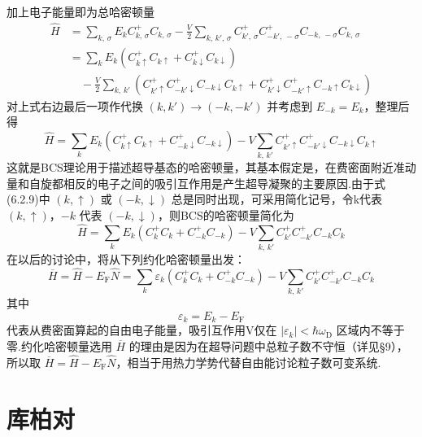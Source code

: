 加上电子能量即为总哈密顿量
\begin{equation*}
\begin{aligned}
  \hat{H}&=\sum_{k,\,\sigma}E_{k}C^{+}_{k,\,\sigma}C_{k,\,\sigma}
  -\frac{V}{2}\sum_{k,\,k',\,\sigma}
  C^{+}_{k',\,\sigma}C^{+}_{-k',\,-\sigma}C_{-k,\,-\sigma}C_{k,\,\sigma}\\
  &=\sum_{k}E_{k}\left(C^{+}_{k\uparrow}C_{k\uparrow}
  +C^{+}_{k\downarrow}C_{k\downarrow}\right)\\
  &\quad-\frac{V}{2}\sum_{k,\,k'}\left(C^{+}_{k'\uparrow}C^{+}_{-k'\downarrow}
  C_{-k\downarrow}C_{k\uparrow}
  +C^{+}_{k'\downarrow}C^{+}_{-k'\uparrow}C_{-k\uparrow}C_{k\downarrow}\right)
\end{aligned}
\end{equation*}
对上式右边最后一项作代换 $(k,k')\to(-k,-k')$ 并考虑到 $E_{-k}=E_{k}$，整理后得
\begin{equation}
  \hat{H}=\sum_{k}E_{k}\left(C^{+}_{k\uparrow}C_{k\uparrow}
  +C^{+}_{-k\downarrow}C_{-k\downarrow}\right)
  -V\sum_{k,\,k'}C^{+}_{k'\uparrow}C^{+}_{-k'\downarrow}C_{-k\downarrow}C_{k\uparrow}
\end{equation}
这就是BCS理论用于描述超导基态的哈密顿量，其基本假定是，在费密面附近准动量和自旋都相反的电子之间的吸引互作用是产生超导凝聚的主要原因.由于式(6.2.9)中 $(k,\uparrow)$ 或 $(-k,\downarrow)$ 总是同时出现，可采用简化记号，令k代表 $(k,\uparrow)$，$-k$ 代表 $(-k,\downarrow)$，则BCS的哈密顿量简化为
\begin{equation}
  \hat{H}=\sum_{k}E_{k}\left(C^{+}_{k}C_{k}+C^{+}_{-k}C_{-k}\right)
  -V\sum_{k,\,k'}C^{+}_{k'}C^{+}_{-k'}C_{-k}C_{k}
\end{equation}
在以后的讨论中，将从下列约化哈密顿量出发：
\begin{equation}
  \overline{H}=\hat{H}-E_{\mathrm{F}}\hat{N}
  =\sum_{k}\varepsilon_{k}\left(C^{+}_{k}C_{k}+C^{+}_{-k}C_{-k}\right)
  -V\sum_{k,\,k'}C^{+}_{k'}C^{+}_{-k'}C_{-k}C_{k}
\end{equation}
其中
\begin{equation}
  \varepsilon_{k}=E_{k}-E_{\mathrm{F}}
\end{equation}
代表从费密面算起的自由电子能量，吸引互作用V仅在 $|\varepsilon_{k}|<\hbar\omega_{\mathrm{D}}$ 区域内不等于零.约化哈密顿量选用 $\overline{H}$ 的理由是因为在超导问题中总粒子数不守恒（详见§9），所以取 $\overline{H}=\hat{H}-E_{\mathrm{F}}\hat{N}$，相当于用热力学势代替自由能讨论粒子数可变系统.

\section{库柏对}

